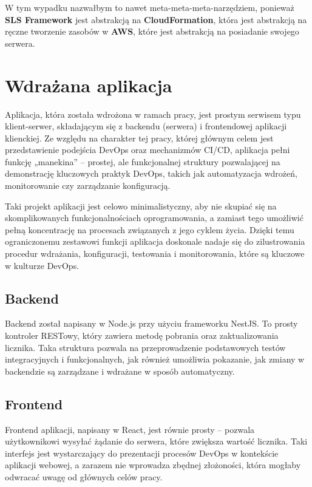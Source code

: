 \documentclass{article}
\begin{document}
W tym wypadku nazwałbym to nawet meta-meta-meta-narzędziem, ponieważ \textbf{SLS Framework} jest abstrakcją na \textbf{CloudFormation}, która jest abstrakcją na ręczne tworzenie zasobów w \textbf{AWS}, które jest abstrakcją na posiadanie swojego serwera.

\section{Wdrażana aplikacja}

Aplikacja, która została wdrożona w ramach pracy, jest prostym serwisem typu klient-serwer, składającym się z backendu (serwera) i frontendowej aplikacji klienckiej. Ze względu na charakter tej pracy, której głównym celem jest przedstawienie podejścia DevOps oraz mechanizmów CI/CD, aplikacja pełni funkcję „manekina” – prostej, ale funkcjonalnej struktury pozwalającej na demonstrację kluczowych praktyk DevOps, takich jak automatyzacja wdrożeń, monitorowanie czy zarządzanie konfiguracją.

Taki projekt aplikacji jest celowo minimalistyczny, aby nie skupiać się na skomplikowanych funkcjonalnościach oprogramowania, a zamiast tego umożliwić pełną koncentrację na procesach związanych z jego cyklem życia. Dzięki temu ograniczonemu zestawowi funkcji aplikacja doskonale nadaje się do zilustrowania procedur wdrażania, konfiguracji, testowania i monitorowania, które są kluczowe w kulturze DevOps.

\subsection{Backend}

Backend został napisany w Node.js przy użyciu frameworku NestJS. To prosty kontroler RESTowy, który zawiera metodę pobrania oraz zaktualizowania licznika. Taka struktura pozwala na przeprowadzenie podstawowych testów integracyjnych i funkcjonalnych, jak również umożliwia pokazanie, jak zmiany w backendzie są zarządzane i wdrażane w sposób automatyczny.

\subsection{Frontend}

Frontend aplikacji, napisany w React, jest równie prosty – pozwala użytkownikowi wysyłać żądanie do serwera, które zwiększa wartość licznika. Taki interfejs jest wystarczający do prezentacji procesów DevOps w kontekście aplikacji webowej, a zarazem nie wprowadza zbędnej złożoności, która mogłaby odwracać uwagę od głównych celów pracy.
\end{document}
